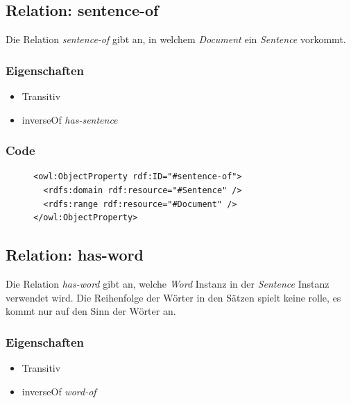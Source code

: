 \documentclass[
    11pt,
    latin1,
    a4paper,
    oneside
]{scrreprt}
\begin{document}
\subsection{Relation: sentence-of} \label{sec:rel_sentenceof}

Die Relation \emph{sentence-of} gibt an, in welchem \emph{Document} ein \emph{Sentence} vorkommt.

\subsubsection{Eigenschaften} \label{sec:rel_sentenceof_settings}

\begin{itemize}
  \item Transitiv
  \item inverseOf \emph{has-sentence}
\end{itemize}

\subsubsection{Code} \label{sec:rel_sentenceof_code}

\begin{figure}[H]
 \lstset{language=XML}
 \begin{lstlisting}[label=owl:sentenceof,caption={Die Relation \emph{sentenceof} gibt an, in welchem Dokument ein Satz vorkommt}]
<owl:ObjectProperty rdf:ID="#sentence-of">
  <rdfs:domain rdf:resource="#Sentence" />
  <rdfs:range rdf:resource="#Document" />
</owl:ObjectProperty>
 \end{lstlisting}
\end{figure}


\subsection{Relation: has-word} \label{sec:rel_hasword}

Die Relation \emph{has-word} gibt an, welche \emph{Word} Instanz in der \emph{Sentence} Instanz verwendet wird. Die Reihenfolge der W\"orter in den S\"atzen spielt keine rolle, es kommt nur auf den Sinn der W\"orter an.

\subsubsection{Eigenschaften} \label{sec:rel_hasword_settings}

\begin{itemize}
  \item Transitiv
  \item inverseOf \emph{word-of}
\end{itemize}
\end{document}
